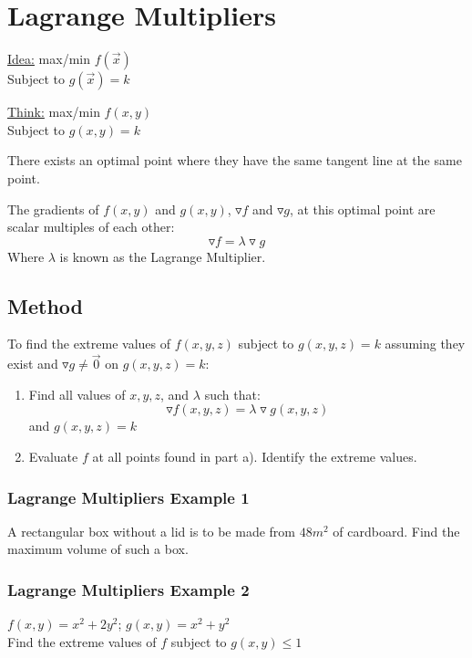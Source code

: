 \documentclass[12pt]{article}
\begin{document}
\section{Lagrange Multipliers}
\underline{Idea:} max/min \(f(\vec{x} ) \) \\
Subject to \(g(\vec{x} ) = k \) 

\underline{Think:} max/min \(f(x,y)\) \\
Subject to \(g(x,y) = k\) 

There exists an optimal point where they have the same tangent line at the same point.

The gradients of \(f(x,y)\) and \(g(x,y)\), \(\triangledown f\) and \(\triangledown g\),  at this optimal point are scalar multiples of each other:
\[
	\triangledown f = \lambda \triangledown g
\]
Where \(\lambda\) is known as the Lagrange Multiplier.

\subsection{Method}
To find the extreme values of \(f(x,y,z)\) subject to \(g(x,y,z) = k\) assuming they exist and \(\triangledown g \neq \vec{0}  \) on \(g(x,y,z) = k\):
\begin{enumerate}
	\item Find all values of \(x,y,z\), and \(\lambda\) such that:
		\[
			\triangledown f(x,y,z) = \lambda \triangledown g(x,y,z)
		\]
		and \(g(x,y,z) = k\) 
	\item Evaluate \(f\) at all points found in part a). Identify the extreme values.
\end{enumerate}

\subsubsection{Lagrange Multipliers Example 1}
A rectangular box without a lid is to be made from \(48m^2\) of cardboard. Find the maximum volume of such a box.

\subsubsection{Lagrange Multipliers Example 2}
\(f(x,y) = x^2 + 2y^2\); \(g(x,y) = x^2 + y^2\) \\ 
Find the extreme values of \(f\) subject to \(g(x,y) \leq 1\) 
\end{document}
